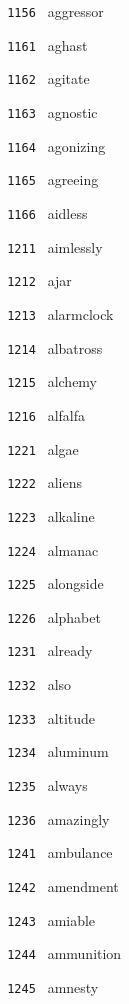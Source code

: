 \documentclass[11pt]{article}
\begin{document}
\begin{multicols}{6}
\noindent \texttt{ 1156 } aggressor  \par
\vspace{3mm}
\noindent \texttt{ 1161 } aghast  \par
\noindent \texttt{ 1162 } agitate  \par
\noindent \texttt{ 1163 } agnostic  \par
\noindent \texttt{ 1164 } agonizing  \par
\noindent \texttt{ 1165 } agreeing  \par
\noindent \texttt{ 1166 } aidless  \par
\noindent \texttt{ 1211 } aimlessly  \par
\noindent \texttt{ 1212 } ajar  \par
\noindent \texttt{ 1213 } alarmclock  \par
\noindent \texttt{ 1214 } albatross  \par
\noindent \texttt{ 1215 } alchemy  \par
\noindent \texttt{ 1216 } alfalfa  \par
\vspace{3mm}
\noindent \texttt{ 1221 } algae  \par
\noindent \texttt{ 1222 } aliens  \par
\noindent \texttt{ 1223 } alkaline  \par
\noindent \texttt{ 1224 } almanac  \par
\noindent \texttt{ 1225 } alongside  \par
\noindent \texttt{ 1226 } alphabet  \par
\vspace{3mm}
\noindent \texttt{ 1231 } already  \par
\noindent \texttt{ 1232 } also  \par
\noindent \texttt{ 1233 } altitude  \par
\noindent \texttt{ 1234 } aluminum  \par
\noindent \texttt{ 1235 } always  \par
\noindent \texttt{ 1236 } amazingly  \par
\vspace{3mm}
\noindent \texttt{ 1241 } ambulance  \par
\noindent \texttt{ 1242 } amendment  \par
\noindent \texttt{ 1243 } amiable  \par
\noindent \texttt{ 1244 } ammunition  \par
\noindent \texttt{ 1245 } amnesty  \par

\end{multicols}
\end{document}
